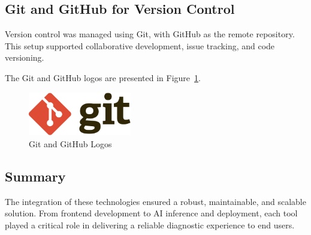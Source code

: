 \subsection{Git and GitHub for Version Control}

Version control was managed using Git, with GitHub as the remote repository. This setup supported collaborative development, issue tracking, and code versioning.

The Git and GitHub logos are presented in Figure~\ref{fig:git_github_logo}.

\begin{figure}[H]
    \centering
    \includegraphics[width=0.4\textwidth]{images/tools/git_github.png}
    \caption{Git and GitHub Logos}
    \label{fig:git_github_logo}
\end{figure}

\subsection{Summary}

The integration of these technologies ensured a robust, maintainable, and scalable solution. From frontend development to AI inference and deployment, each tool played a critical role in delivering a reliable diagnostic experience to end users.
